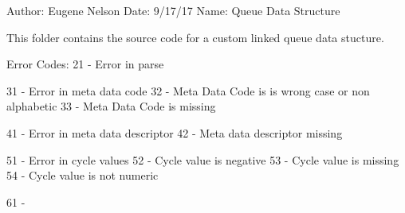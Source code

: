 Author\-: Eugene Nelson Date\-: 9/17/17 Name\-: Queue Data Structure \begin{DoxyVerb}This folder contains the source code for a custom linked queue data stucture.   
\end{DoxyVerb}


Error Codes\-: 21 -\/ Error in parse

31 -\/ Error in meta data code 32 -\/ Meta Data Code is is wrong case or non alphabetic 33 -\/ Meta Data Code is missing

41 -\/ Error in meta data descriptor 42 -\/ Meta data descriptor missing

51 -\/ Error in cycle values 52 -\/ Cycle value is negative 53 -\/ Cycle value is missing 54 -\/ Cycle value is not numeric

61 -\/ 